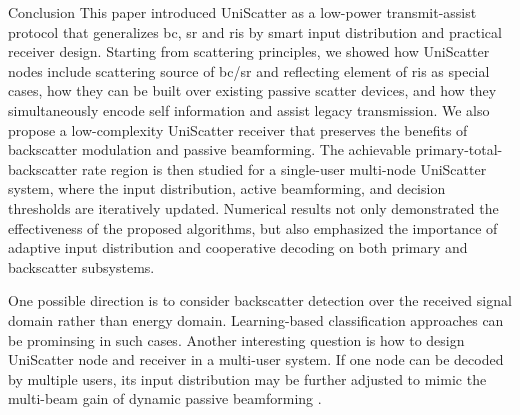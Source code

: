 \documentclass[journal]{IEEEtran}
\begin{document}
\begin{section}{Conclusion}
	This paper introduced UniScatter as a low-power transmit-assist protocol that generalizes \gls{bc}, \gls{sr} and \gls{ris} by smart input distribution and practical receiver design.
	Starting from scattering principles, we showed how UniScatter nodes include scattering source of \gls{bc}/\gls{sr} and reflecting element of \gls{ris} as special cases, how they can be built over existing passive scatter devices, and how they simultaneously encode self information and assist legacy transmission.
	We also propose a low-complexity UniScatter receiver that preserves the benefits of backscatter modulation and passive beamforming.
	The achievable primary-total-backscatter rate region is then studied for a single-user multi-node UniScatter system, where the input distribution, active beamforming, and decision thresholds are iteratively updated.
	Numerical results not only demonstrated the effectiveness of the proposed algorithms, but also emphasized the importance of adaptive input distribution and cooperative decoding on both primary and backscatter subsystems.

	One possible direction is to consider backscatter detection over the received signal domain rather than energy domain.
	Learning-based classification approaches can be prominsing in such cases.
	Another interesting question is how to design UniScatter node and receiver in a multi-user system.
	If one node can be decoded by multiple users, its input distribution may be further adjusted to mimic the multi-beam gain of dynamic passive beamforming \cite{Qiu2022}.
\end{section}
\end{document}
